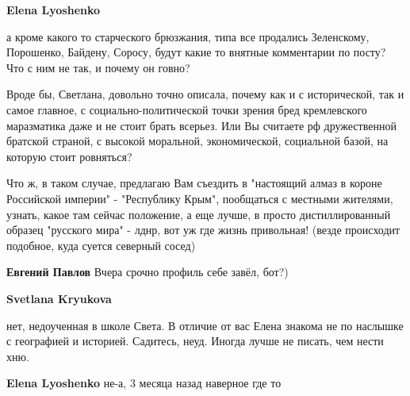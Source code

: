 \begin{itemize}
\begin{itemize}
 
\textbf{Elena Lyoshenko} 

а кроме какого то старческого брюзжания, типа все продались Зеленскому,
Порошенко, Байдену, Соросу, будут какие то внятные комментарии по посту? Что с
ним не так, и почему он говно? 

Вроде бы, Светлана, довольно точно описала, почему как и с исторической, так и
самое главное, с социально-политической точки зрения бред кремлевского
маразматика даже и не стоит брать всерьез. Или Вы считаете рф дружественной
братской страной, с высокой моральной, экономической, социальной базой, на
которую стоит ровняться? 

Что ж, в таком случае, предлагаю Вам съездить в "настоящий алмаз в короне
Российской империи" - "Республику Крым", пообщаться с местными жителями,
узнать, какое там сейчас положение, а еще лучше, в просто дистиллированный
образец "русского мира" - лднр, вот уж где жизнь привольная! (везде происходит
подобное, куда суется северный сосед)

 

\textbf{Евгений Павлов}
Вчера срочно профиль себе завёл, бот?)

 
\textbf{Svetlana Kryukova} 

нет, недоученная в школе Света. \Laughey[1.0][white] В отличие от вас Елена знакома не по
наслышке с географией и историей. Садитесь, неуд. Иногда лучше не писать, чем
нести хню.


 
\textbf{Elena Lyoshenko} не-а, 3 месяца назад наверное где то


\end{itemize}
\end{itemize}
